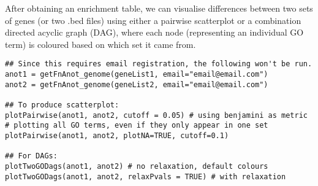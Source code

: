 \documentclass[11pt, oneside]{article}
\begin{document}
After obtaining an enrichment table, we can visualise differences between two sets of genes (or two .bed files) using either a pairwise scatterplot or a combination directed acyclic graph (DAG), where each node (representing an individual GO term) is coloured based on which set it came from.
\begin{verbatim}
## Since this requires email registration, the following won't be run.
anot1 = getFnAnot_genome(geneList1, email="email@email.com")
anot2 = getFnAnot_genome(geneList2, email="email@email.com")

## To produce scatterplot:
plotPairwise(anot1, anot2, cutoff = 0.05) # using benjamini as metric
# plotting all GO terms, even if they only appear in one set
plotPairwise(anot1, anot2, plotNA=TRUE, cutoff=0.1)

## For DAGs:
plotTwoGODags(anot1, anot2) # no relaxation, default colours
plotTwoGODags(anot1, anot2, relaxPvals = TRUE) # with relaxation
\end{verbatim}
\end{document}
